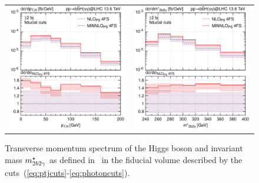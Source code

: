 \documentclass[11pt,a4paper]{article}
\begin{document}
\begin{figure}[t!]
\begin{center}
\begin{tabular}{cc}
\includegraphics[width=.45\textwidth, page=1]{plots/4fs/pt_Higgs-EXP-fid-FC.pdf}&
\includegraphics[width=.45\textwidth, page=1]{plots/4fs/mass_2b2gam-EXP-fid-FC.pdf}
\end{tabular}
\vspace*{1ex}
\caption{Transverse momentum spectrum of the Higgs boson and invariant mass $m_{2b2\gamma}^{\star}$ as defined in~ in the fiducial volume described by the cuts~(\ref{eq:ptjcuts}-\ref{eq:photoncuts}).\label{fig:4fsFID}}
\end{center}
\end{figure}
\end{document}
